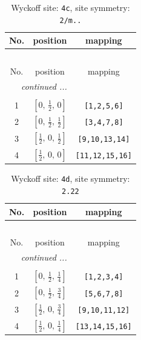 \documentclass[fleqn,8pt]{jsarticle}
\begin{document}
\renewcommand{\arraystretch}{1.2}
\begin{longtable}{ccc}
\caption{Wyckoff site: {\tt 4c}, site symmetry: {\tt 2/m..}}
 \\
 \hline \hline
No. & position & mapping \\ \hline \endfirsthead

\multicolumn{2}{l}{\tablename\ \thetable{}} \\
 \hline \hline
No. & position & mapping \\ \hline \endhead

 \hline \hline
\multicolumn{2}{r}{\footnotesize\it continued ...} \\ \endfoot

 \hline \hline
\multicolumn{2}{r}{} \\ \endlastfoot

1 & $\left[ 0,\, \frac{1}{2},\, 0 \right]$ & {\tt [1,2,5,6]} \\ \hline
2 & $\left[ 0,\, \frac{1}{2},\, \frac{1}{2} \right]$ & {\tt [3,4,7,8]} \\ \hline
3 & $\left[ \frac{1}{2},\, 0,\, \frac{1}{2} \right]$ & {\tt [9,10,13,14]} \\ \hline
4 & $\left[ \frac{1}{2},\, 0,\, 0 \right]$ & {\tt [11,12,15,16]} \\
\end{longtable}
\renewcommand{\arraystretch}{1.2}
\begin{longtable}{ccc}
\caption{Wyckoff site: {\tt 4d}, site symmetry: {\tt 2.22}}
 \\
 \hline \hline
No. & position & mapping \\ \hline \endfirsthead

\multicolumn{2}{l}{\tablename\ \thetable{}} \\
 \hline \hline
No. & position & mapping \\ \hline \endhead

 \hline \hline
\multicolumn{2}{r}{\footnotesize\it continued ...} \\ \endfoot

 \hline \hline
\multicolumn{2}{r}{} \\ \endlastfoot

1 & $\left[ 0,\, \frac{1}{2},\, \frac{1}{4} \right]$ & {\tt [1,2,3,4]} \\ \hline
2 & $\left[ 0,\, \frac{1}{2},\, \frac{3}{4} \right]$ & {\tt [5,6,7,8]} \\ \hline
3 & $\left[ \frac{1}{2},\, 0,\, \frac{3}{4} \right]$ & {\tt [9,10,11,12]} \\ \hline
4 & $\left[ \frac{1}{2},\, 0,\, \frac{1}{4} \right]$ & {\tt [13,14,15,16]} \\
\end{longtable}
\end{document}
